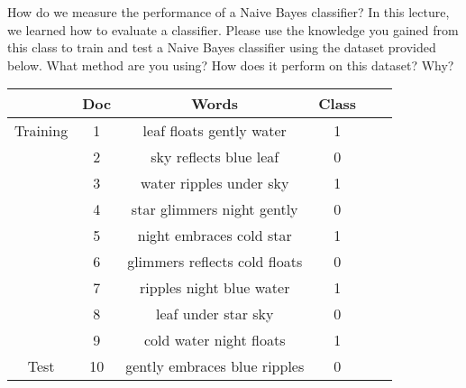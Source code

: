 \documentclass{article}
\begin{document}
How do we measure the performance of a Naive Bayes classifier? In this lecture, we learned how to evaluate a classifier. Please use the knowledge you gained from this class to train and test a Naive Bayes classifier using the dataset provided below. What method are you using? How does it perform on this dataset? Why?

\begin{center}
    \begin{tabular}{|c|c|c|c|c|c|}
    \hline
     & Doc & Words & Class \\ \hline
    Training & 1 & leaf floats gently water & 1 \\ \hline
            & 2 & sky reflects blue leaf & 0 \\ \hline
            & 3 & water ripples under sky & 1 \\ \hline
            & 4 & star glimmers night gently & 0 \\ \hline
            & 5 & night embraces cold star & 1 \\ \hline
            & 6 & glimmers reflects cold floats & 0 \\ \hline
            & 7 & ripples night blue water & 1 \\ \hline
            & 8 & leaf under star sky & 0 \\ \hline
            & 9 & cold water night floats & 1 \\ \hline
    Test    & 10 & gently embraces blue ripples & 0 \\ \hline

    \end{tabular}
\end{center}
\end{document}
